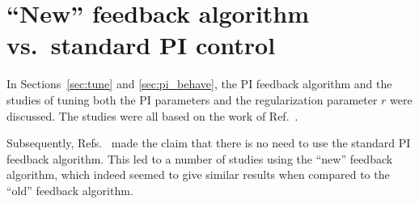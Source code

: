 


\section{``New'' feedback algorithm vs.~standard PI control}\label{sec:style_pi}


In Sections~\ref{sec:tune} and \ref{sec:pi_behave}, the PI
feedback algorithm and the studies of tuning both the PI parameters and
the regularization parameter $r$ were discussed. The studies were all based on the
work of Ref.~\cite{bea}.

Subsequently, Refs.~\cite{rawlik,rawkliknedm2017,rawlikpriv} made the
claim that there is no need to use the standard PI feedback algorithm.
This led to a number of studies using the ``new'' feedback algorithm,
which indeed seemed to give similar results when compared to the
``old'' feedback algorithm.

